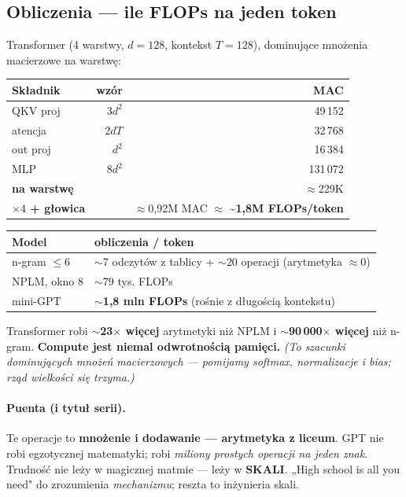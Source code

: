\documentclass[11pt,a4paper]{article}
\begin{document}
\subsection{Obliczenia --- ile FLOPs na jeden token}
Transformer (4 warstwy, $d=128$, kontekst $T=128$), dominujące mnożenia macierzowe na warstwę:
\begin{table}[h]
  \centering
  \begin{tabular}{lrr}
    \toprule
    Składnik & wzór & MAC \\
    \midrule
    QKV proj & $3d^2$ & 49\,152 \\
    atencja  & $2dT$  & 32\,768 \\
    out proj & $d^2$  & 16\,384 \\
    MLP      & $8d^2$ & 131\,072 \\
    \midrule
    \textbf{na warstwę} & & $\approx$229K \\
    \textbf{$\times 4$ + głowica} & & $\approx$0,92M MAC $\approx$ \textbf{\textasciitilde1,8M FLOPs/token} \\
    \bottomrule
  \end{tabular}
\end{table}

\begin{table}[h]
  \centering
  \begin{tabular}{ll}
    \toprule
    Model & obliczenia / token \\
    \midrule
    n-gram $\le 6$ & $\sim$7 odczytów z tablicy + $\sim$20 operacji (arytmetyka $\approx 0$) \\
    NPLM, okno 8 & $\sim$79 tys. FLOPs \\
    mini-GPT & \textbf{$\sim$1,8 mln FLOPs} (rośnie z długością kontekstu) \\
    \bottomrule
  \end{tabular}
\end{table}

Transformer robi \textbf{$\sim$23$\times$ więcej} arytmetyki niż NPLM i \textbf{$\sim$90\,000$\times$ więcej} niż n-gram. \textbf{Compute jest niemal odwrotnością pamięci.} \emph{(To szacunki dominujących mnożeń macierzowych --- pomijamy softmax, normalizacje i bias; rząd wielkości się trzyma.)}

\paragraph{Puenta (i tytuł serii).} Te operacje to \textbf{mnożenie i dodawanie --- arytmetyka z liceum}. GPT nie robi egzotycznej matematyki; robi \emph{miliony prostych operacji na jeden znak}. Trudność nie leży w magicznej matmie --- leży w \textbf{SKALI}. „High school is all you need" do zrozumienia \emph{mechanizmu}; reszta to inżynieria skali.
\end{document}
